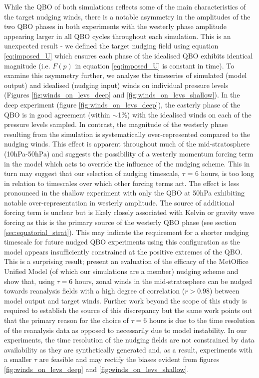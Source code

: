 While the QBO of both simulations reflects some of the main characteristics of the target nudging winds, there is a notable asymmetry in the amplitudes of the two QBO phases in both experiments with the westerly phase amplitude appearing larger in all QBO cycles throughout each simulation. This is an unexpected result - we defined the target nudging field using equation \ref{eq:imposed_U} which ensures each phase of the idealised QBO exhibits identical magnitude (i.e. $F(p)$ in equation \ref{eq:imposed_U} is constant in time). To examine this asymmetry further, we analyse the timeseries of simulated (model output) and idealised (nudging input) winds on individual pressure levels (Figures \ref{fig:winds_on_levs_deep} and \ref{fig:winds_on_levs_shallow}). In the deep experiment (figure \ref{fig:winds_on_levs_deep}), the easterly phase of the QBO is in good agreement (within $\sim$1\%) with the idealised winds on each of the pressure levels sampled. In contrast, the magnitude of the westerly phase resulting from the simulation is systematically over-represented compared to the nudging winds. This effect is apparent throughout much of the mid-stratosphere (10hPa-50hPa) and suggests the possibility of a westerly momentum forcing term in the model which acts to override the influence of the nudging scheme. This in turn may suggest that our selection of nudging timescale, $\tau$ = 6 hours, is too long in relation to timescales over which other forcing terms  act. The effect is less pronounced in the shallow experiment with only the QBO at 50hPa exhibiting notable over-representation in westerly amplitude. The source of additional forcing term is unclear but is likely closely associated with Kelvin or gravity wave forcing as this is the primary source of the westerly QBO phase (see section \ref{sec:equatorial_strat}). This may indicate the requirement for a shorter nudging timescale for future nudged QBO experiments using this configuration as the model appears  insufficiently constrained at the positive extremes of the QBO. This is a surprising result; \cite{telfordTechnical2008} present an evaluation of the efficacy of the MetOffice Unified Model (of which our simulations are a member) nudging scheme and show that, using $\tau = 6$ hours, zonal winds in the mid-stratosphere can be nudged towards reanalysis fields with a high degree of correlation ($r>0.98$) between model output and target winds. Further work beyond the scope of this study is required to establish the source of this discrepancy but the same work points out that the primary reason for the choice of $\tau = 6$ hours is due to the time resolution of the reanalysis data as opposed to necessarily due to model instability. In our experiments, the time resolution of the nudging fields are not constrained by data availability as they are synthetically generated and, as a result, experiments with a smaller $\tau$ are feasible and may rectify the biases evident from figures \ref{fig:winds_on_levs_deep} and \ref{fig:winds_on_levs_shallow}.

